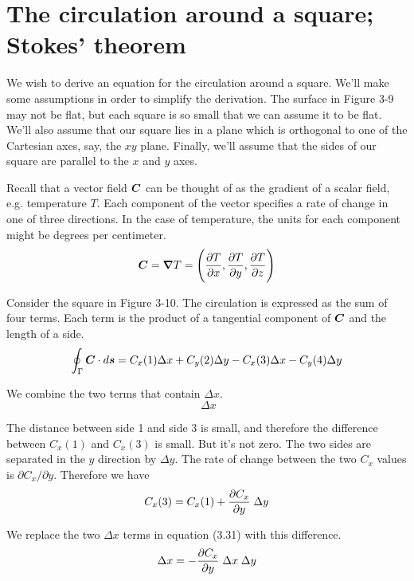 \section{The circulation around a square; \\ Stokes' theorem}

We wish to derive an equation for the circulation around a square.
We'll make some assumptions in order to simplify the derivation.
The surface in Figure 3-9 may not be flat,
but each square is so small that we can assume it to be flat.
We'll also assume that our square lies in a plane which is
orthogonal to one of the Cartesian axes, say, the $xy$ plane.
Finally, we'll assume that the sides of our square
are parallel to the $x$ and $y$ axes.

Recall that a vector field $\boldsymbol{C}$ can be thought of as
the gradient of a scalar field, e.g. temperature $T$.
Each component of the vector specifies a rate of change
in one of three directions. In the case of temperature,
the units for each component might be degrees per centimeter.
\[ \boldsymbol{C} = \boldsymbol{\nabla} T = \Bigg( \frac{\partial T}{\partial x}, \frac{\partial T}{\partial y}, \frac{\partial T}{\partial z} \Bigg) \]

Consider the square in Figure 3-10.
The circulation is expressed as the sum of four terms.
Each term is the product of a tangential component of $\boldsymbol{C}$ and the length of a side.
\begin{equation}
  \oint_\Gamma \boldsymbol{C} \cdot d\boldsymbol{s} =
  C_x(1) \Delta x + C_y(2) \Delta y - C_x(3) \Delta x - C_y(4) \Delta y
\end{equation}

We combine the two terms that contain $\Delta x$.
\begin{equation}
  [C_x(1) - C_x(3)] \; \Delta x
\end{equation}

The distance between side 1 and side 3 is small,
and therefore the difference between $C_x(1)$ and $C_x(3)$ is small.  But it's not zero.
The two sides are separated in the $y$ direction by $\Delta y$.
The rate of change between the two $C_x$ values is $\partial C_x / \partial y$.
Therefore we have
\begin{equation}
  C_x(3) = C_x(1) + \frac{\partial C_x}{\partial y} \; \Delta y
\end{equation}

We replace the two $\Delta x$ terms in equation (3.31) with this difference.
\begin{equation}
  [C_x(1) - C_x(3)] \Delta x = - \dfdx{C_x}{y} \; \Delta x \; \Delta y
\end{equation}

